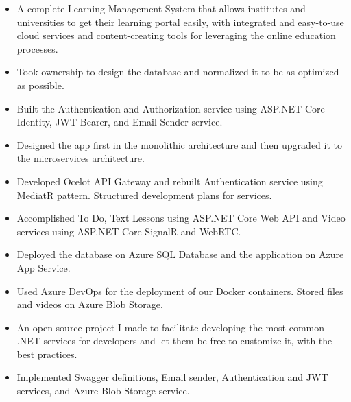 


\begin{itemize}
    \item A complete Learning Management System that allows institutes and universities to get their learning portal easily, with integrated and easy-to-use cloud services and content-creating tools for leveraging the online education processes.
    \item Took ownership to design the database and normalized it to be as optimized as possible.
    \item Built the Authentication and Authorization service using ASP.NET Core Identity, JWT Bearer, and Email Sender service.
    \item Designed the app first in the monolithic architecture and then upgraded it to the microservices architecture.
    \item Developed Ocelot API Gateway and rebuilt Authentication service using MediatR pattern. Structured development plans for services.
    \item Accomplished To Do, Text Lessons using ASP.NET Core Web API and Video services using ASP.NET Core SignalR and WebRTC.
    \item Deployed the database on Azure SQL Database and the application on Azure App Service.
    \item Used Azure DevOps for the deployment of our Docker containers. Stored files and videos on Azure Blob Storage.
\end{itemize}

\divider

\begin{itemize}
    \item An open-source project I made to facilitate developing the most common .NET services for developers and let them be free to customize it, with the best practices.
    \item Implemented Swagger definitions, Email sender, Authentication and JWT services, and Azure Blob Storage service.
\end{itemize}

